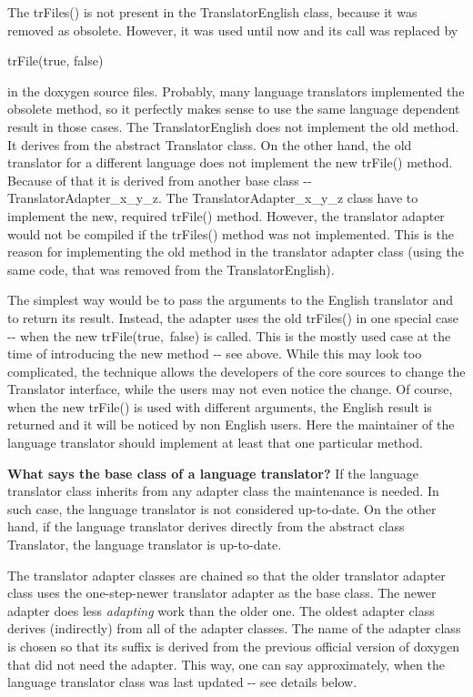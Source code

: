 The {\ttfamily trFiles()} is not present in the {\ttfamily TranslatorEnglish} class, because it was removed as obsolete. However, it was used until now and its call was replaced by

\begin{DoxyVerb}
    trFile(true, false)
\end{DoxyVerb}


in the doxygen source files. Probably, many language translators implemented the obsolete method, so it perfectly makes sense to use the same language dependent result in those cases. The {\ttfamily TranslatorEnglish} does not implement the old method. It derives from the abstract {\ttfamily Translator} class. On the other hand, the old translator for a different language does not implement the new {\ttfamily trFile()} method. Because of that it is derived from another base class -\/-\/ {\ttfamily TranslatorAdapter\_\-x\_\-y\_\-z}. The {\ttfamily TranslatorAdapter\_\-x\_\-y\_\-z} class have to implement the new, required {\ttfamily trFile()} method. However, the translator adapter would not be compiled if the {\ttfamily trFiles()} method was not implemented. This is the reason for implementing the old method in the translator adapter class (using the same code, that was removed from the TranslatorEnglish).

The simplest way would be to pass the arguments to the English translator and to return its result. Instead, the adapter uses the old {\ttfamily trFiles()} in one special case -\/-\/ when the new {\ttfamily trFile(true,~false)} is called. This is the mostly used case at the time of introducing the new method -\/-\/ see above. While this may look too complicated, the technique allows the developers of the core sources to change the Translator interface, while the users may not even notice the change. Of course, when the new {\ttfamily trFile()} is used with different arguments, the English result is returned and it will be noticed by non English users. Here the maintainer of the language translator should implement at least that one particular method.

{\bfseries What says the base class of a language translator?} If the language translator class inherits from any adapter class the maintenance is needed. In such case, the language translator is not considered up-\/to-\/date. On the other hand, if the language translator derives directly from the abstract class {\ttfamily Translator}, the language translator is up-\/to-\/date.

The translator adapter classes are chained so that the older translator adapter class uses the one-\/step-\/newer translator adapter as the base class. The newer adapter does less {\itshape adapting\/} work than the older one. The oldest adapter class derives (indirectly) from all of the adapter classes. The name of the adapter class is chosen so that its suffix is derived from the previous official version of doxygen that did not need the adapter. This way, one can say approximately, when the language translator class was last updated -\/-\/ see details below.

